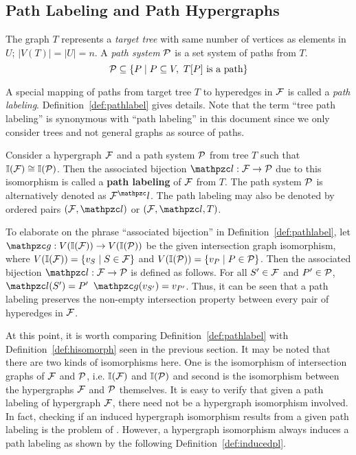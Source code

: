 \subsection{Path Labeling and Path Hypergraphs}
\label{sec:pathhypergraph}
The graph $T$ represents a {\em target tree} with same number of
vertices as elements in $U$; $|V(T)|=|U|=n$.  A {\em path system}
${\cal P}$ is a set system of paths from $T$. 
\[{\cal P} \subseteq \{P \mid P \subseteq V, \text{ } T[P] \text{ is a
  path} \}\] 

A special mapping of paths from target tree $T$ to hyperedges in ${\cal F}$
is called a {\em path labeling}. Definition~\ref{def:pathlabel} gives
details. Note that the term ``tree path labeling'' is synonymous
with ``path labeling'' in this document since we only consider trees and
not general graphs as source of paths.

\begin{definition}
  \label{def:pathlabel}
  Consider a hypergraph ${\cal F}$ %
  and a path system ${\cal P}$ from tree $T$ such that $\mathbb I({\cal F}) \cong
  \mathbb I({\cal P})$.  Then the associated bijection $\cl: \cF
  \rightarrow \cP$ due to this isomorphism is called a \textbf{path
    labeling} of ${\cal F}$ from $T$. The path system ${\cal P}$ is
  alternatively denoted as $\cF^\cl$. The path labeling may also be
  denoted by ordered pairs $(\cF,\cl)$ or $(\cF,\cl,T)$.
\end{definition}
To elaborate on the phrase ``associated bijection'' in
Definition~\ref{def:pathlabel}, let $\cg: V(\bI(\cF)) \rightarrow
V(\bI(\cP))$ be the given intersection graph isomorphism, where
$V(\mathbb I({\cal F})) = \{ v_S \mid S \in {\cal F}\}$ and $V(\mathbb I({\cal P})) = \{v_P \mid
P \in {\cal P}\}$. Then the associated bijection $\cl: \cF \rightarrow \cP$
is defined as follows. For all $S' \in {\cal F}$ and $P' \in {\cal P}$, $\cl(S')
= P'$ \iff $\cg(v_{S'}) = v_{P'}$.  Thus, it can be seen that a path
labeling preserves the non-empty intersection property between every
pair of hyperedges in ${\cal F}$.

At this point, it is worth comparing Definition~\ref{def:pathlabel}
with Definition~\ref{def:hisomorph} seen in the previous section.  It
may be noted that there are two kinds of isomorphisms here. One is the
isomorphism of intersection graphs of ${\cal F}$ and ${\cal P}$, i.e. $\mathbb I({\cal F})$
and $\mathbb I({\cal P})$ and second is the isomorphism between the hypergraphs
${\cal F}$ and ${\cal P}$ themselves. It is easy to verify that given a path
labeling of hypergraph ${\cal F}$, there need not be a hypergraph
isomorphism involved. In fact, checking if an induced hypergraph
isomorphism results from a given path labeling is the problem of
\CFTPL.  However, a hypergraph isomorphism always induces a path
labeling as shown by the following Definition~\ref{def:inducedpl}.  

